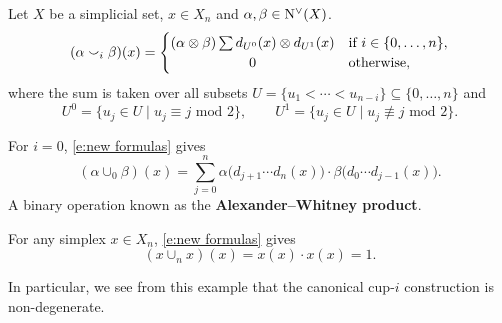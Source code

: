 \begin{definition} \label{d:my cup-i construction}
	Let $X$ be a simplicial set, $x \in X_n$ and $\alpha, \beta \in \operatorname{N^{\vee}}(X)$.
	\begin{equation} \label{e:new formulas}
	(\alpha \cup_i \beta)(x) =
	\begin{cases}
	(\alpha \ot \beta) \sum d_{U^0}(x) \ot d_{U^1}(x) &
	\text{if } i \in \{0, \dots, n\}, \\
	\hfil 0 &
	\text{otherwise},
	\end{cases}
	\end{equation}
	where the sum is taken over all subsets $U = \{u_1 < \cdots < u_{n-i}\} \subseteq \{0, \dots, n\}$ and
	\begin{equation} \label{e:partition subsets}
	U^0 = \{u_j \in U \mid u_j \equiv j \text{ mod } 2\}, \qquad
	U^1 = \{u_j \in U \mid u_j \not\equiv j \text{ mod } 2\}.
	\end{equation}
\end{definition}

\begin{example} \label{ex:alexander-whitney diagonal}
	For $i = 0$, \cref{e:new formulas} gives
	\begin{equation*}
	(\alpha \cup_0 \beta)(x) =
	\sum_{j=0}^n \alpha \big(d_{j+1} \cdots d_{n}(x)\big) \cdot \beta \big(d_{0} \cdots d_{j-1}(x)\big).
	\end{equation*}
	A binary operation known as the \textbf{Alexander--Whitney product}.
\end{example}

\begin{example} \label{ex:Sq0 is the identity}
	For any simplex $x \in X_n$, \cref{e:new formulas} gives
	\begin{equation*}
	(x \cup_n x)(x) = x(x) \cdot x(x) = 1.
	\end{equation*}
\end{example}

In particular, we see from this example that the canonical cup-$i$ construction is non-degenerate.

